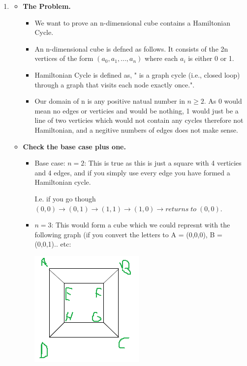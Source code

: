 \documentclass{article}
\begin{document}
\begin{enumerate}
\begin{enumerate}
        \item
        \begin{itemize}          
          \item \textbf{The Problem.}
          \begin{itemize}
            \item We want to prove an n-dimensional cube contains a Hamiltonian Cycle. 
            \item An n-dimensional cube is defned as follows. It consists of the 2n vertices of the form $(a_0, a_1, ..., a_n)$ where each $a_i$ is either 0 or 1.
            \item Hamiltonian Cycle is defined as, " is a graph cycle (i.e., closed loop) through a graph that visits each node exactly once.".
            \item Our domain of n is any positive natual number in $n \ge 2$. As 0 would mean no edges or verticies and would be nothing, 1 would just be a line of two verticies which would not contain any cycles therefore not Hamiltonian, and a negitive numbers of edges does not make sense.
          \end{itemize}
          \item \textbf{Check the base case plus one.}
          \begin{itemize}
            \item Base case: $n = 2$: This is true as this is just a square with 4 verticies and 4 edges, and if you simply use every edge you have formed a Hamiltonian cycle.
            
            I.e. if you go though $(0,0) \rightarrow (0,1) \rightarrow (1,1) \rightarrow (1,0) \rightarrow returns\;to\;(0,0)$.
            \item $n = 3$: This would form a cube which we could represnt with the following graph (if you convert the letters to A = (0,0,0), B = (0,0,1).. etc:             
            
            \includegraphics[scale=0.5]{cube.png}


\end{itemize}
\end{itemize}
\end{enumerate}
\end{enumerate}
\end{document}
